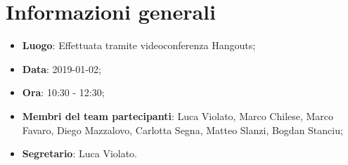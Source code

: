 \section{Informazioni generali}
\begin{itemize}
	\item \textbf{Luogo}: Effettuata tramite videoconferenza Hangouts; 
	\item \textbf{Data}: 2019-01-02; 
	\item \textbf{Ora}: 10:30 - 12:30; 
	\item \textbf{Membri del team partecipanti}: Luca Violato, Marco Chilese, Marco Favaro, 
	Diego Mazzalovo, Carlotta Segna, Matteo Slanzi, Bogdan Stanciu; 
	\item \textbf{Segretario}: Luca Violato. 
\end{itemize}






